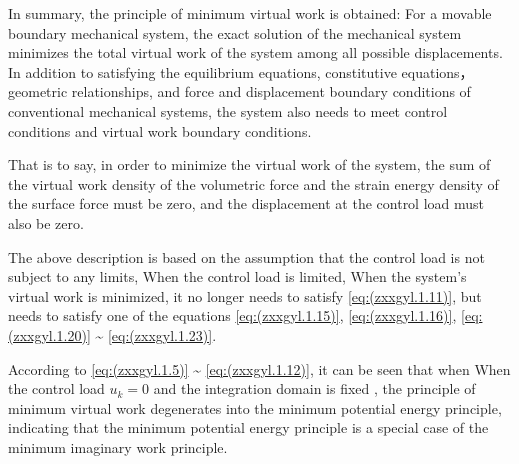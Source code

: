 In summary, the principle of minimum virtual work is obtained: 
For a movable boundary mechanical system, the exact solution of the mechanical system minimizes the total virtual work of the system among all possible displacements. In addition to satisfying the equilibrium equations, constitutive equations，geometric relationships, and force and displacement boundary conditions of conventional mechanical systems, the system also needs to meet control conditions and virtual work boundary conditions.

That is to say, in order to minimize the virtual work of the system, the sum of the virtual work density of the volumetric force and the strain energy density of the surface force must be zero, and the displacement at the control load must also be zero.

The above description is based on the assumption that the control load is not subject to any limits, When the control load is limited,  When the system's virtual work is minimized, it no longer needs to satisfy \ref {eq:(zxxgyl.1.11)}, but needs to satisfy one of the equations \ref {eq:(zxxgyl.1.15)}, \ref{eq:(zxxgyl.1.16)}, \ref{eq:(zxxgyl.1.20)} \~{} \ref{eq:(zxxgyl.1.23)}.

According to \ref{eq:(zxxgyl.1.5)} \~{} \ref{eq:(zxxgyl.1.12)}, it can be seen that when When the control load $u_k=0 $ and the integration domain is fixed , the principle of minimum virtual work degenerates into the minimum potential energy principle, indicating that the minimum potential energy principle is a special case of the minimum imaginary work principle.

